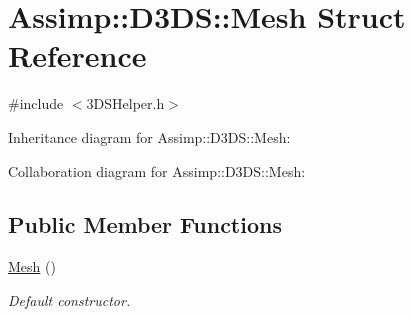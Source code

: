 \hypertarget{struct_assimp_1_1_d3_d_s_1_1_mesh}{\section{Assimp\+:\+:D3\+D\+S\+:\+:Mesh Struct Reference}
\label{struct_assimp_1_1_d3_d_s_1_1_mesh}
}


{\ttfamily \#include $<$3\+D\+S\+Helper.\+h$>$}



Inheritance diagram for Assimp\+:\+:D3\+D\+S\+:\+:Mesh\+:


Collaboration diagram for Assimp\+:\+:D3\+D\+S\+:\+:Mesh\+:
\subsection*{Public Member Functions}
\begin{DoxyCompactItemize}
\item 
\hypertarget{struct_assimp_1_1_d3_d_s_1_1_mesh_a3f7ee143284208895246a8b6ecf35e73}{\hyperlink{struct_assimp_1_1_d3_d_s_1_1_mesh_a3f7ee143284208895246a8b6ecf35e73}{Mesh} ()}\label{struct_assimp_1_1_d3_d_s_1_1_mesh_a3f7ee143284208895246a8b6ecf35e73}

\begin{DoxyCompactList}\small\item\em Default constructor. \end{DoxyCompactList}\end{DoxyCompactItemize}
